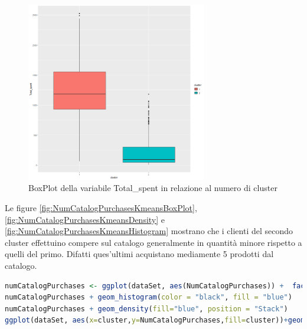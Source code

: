 \documentclass[letterpaper,11pt]{article}
\begin{document}
\begin{figure}[H]
    \centering
    \includegraphics[width=0.7\textwidth]{Img/K-MEANS/KMEANS015.png}
    \caption{BoxPlot della variabile Total\_spent in relazione al numero di cluster}
    \label{fig:TotalSpentKmeansBoxPlot}
\end{figure}

Le figure \ref{fig:NumCatalogPurchasesKmeansBoxPlot}, \ref{fig:NumCatalogPurchasesKmeansDensity} e \ref{fig:NumCatalogPurchasesKmeansHistogram} mostrano che i clienti del secondo cluster effettuino compere sul catalogo generalmente in quantità minore rispetto a quelli del primo. Difatti ques'ultimi acquistano mediamente 5 prodotti dal catalogo.
\begin{lstlisting}[language=R]
numCatalogPurchases <- ggplot(dataSet, aes(NumCatalogPurchases)) +  facet_grid(cluster~.)
numCatalogPurchases + geom_histogram(color = "black", fill = "blue") 
numCatalogPurchases + geom_density(fill="blue", position = "Stack")
ggplot(dataSet, aes(x=cluster,y=NumCatalogPurchases,fill=cluster))+geom_boxplot(outlier.colour="black") + ylim(0,10)
\end{lstlisting}
\end{document}
